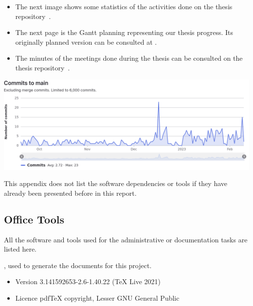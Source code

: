 \label{appendix:project}

\begin{itemize}
	\item The next image shows some statistics of the activities done on the thesis repository~\cite{mt-forge}.
	\item The next page is the Gantt planning representing our thesis progress. Its originally planned version can be consulted at .
	\item The minutes of the meetings done during the thesis can be consulted on the thesis repository~\cite{mt-forge}.
\end{itemize}

\vspace{5cm}

\includegraphics[width=1\textwidth]{03-tail/appendices/repository.png}



\label{appendix:software}

This appendix does not list the software dependencies or tools if they have already been presented before in this report.

\subsection*{Office Tools}

All the software and tools used for the administrative or documentation tasks are listed here.

, used to generate the documents for this project.

\begin{itemize}
	\item Version 3.141592653-2.6-1.40.22 (TeX Live 2021)
	\item Licence pdfTeX copyright, Lesser GNU General Public
\end{itemize}


